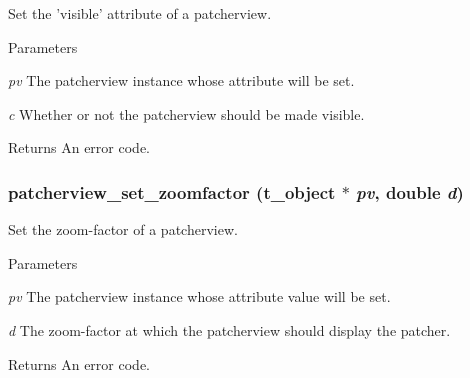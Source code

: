 Set the 'visible' attribute of a patcherview. 
\begin{DoxyParams}{Parameters}
\item[{\em pv}]The patcherview instance whose attribute will be set. \item[{\em c}]Whether or not the patcherview should be made visible. \end{DoxyParams}
\begin{DoxyReturn}{Returns}
An error code. 
\end{DoxyReturn}
\hypertarget{group__jpatcherview_ga5006e672580027e9ae56c49ca3148c3c}{
\subsubsection[{patcherview\_\-set\_\-zoomfactor}]{ patcherview\_\-set\_\-zoomfactor ({\bf t\_\-object} $\ast$ {\em pv}, \/  double {\em d})}}
\label{group__jpatcherview_ga5006e672580027e9ae56c49ca3148c3c}


Set the zoom-\/factor of a patcherview. 
\begin{DoxyParams}{Parameters}
\item[{\em pv}]The patcherview instance whose attribute value will be set. \item[{\em d}]The zoom-\/factor at which the patcherview should display the patcher. \end{DoxyParams}
\begin{DoxyReturn}{Returns}
An error code. 
\end{DoxyReturn}
